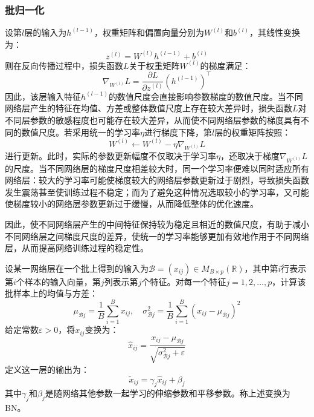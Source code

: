 \subsubsection{批归一化}
设第$l$层的输入为$h^{(l-1)}$，权重矩阵和偏置向量分别为$W^{(l)}$和$b^{(l)}$，其线性变换为：
\begin{equation*}
	z^{(l)}=W^{(l)}h^{(l-1)}+b^{(l)}
\end{equation*}
则在反向传播过程中，损失函数$L$关于权重矩阵$W^{(l)}$的梯度满足：
\begin{equation*}
	\nabla_{W^{(l)}}L=\frac{\partial L}{\partial z^{(l)}}\left(h^{(l-1)}\right)^{\top}
\end{equation*}
因此，该层输入特征$h^{(l-1)}$的数值尺度会直接影响参数梯度的数值尺度。当不同网络层产生的特征在均值、方差或整体数值尺度上存在较大差异时，损失函数$L$对不同层参数的敏感程度也可能存在较大差异，从而使不同网络层参数的梯度具有不同的数值尺度。若采用统一的学习率$\eta$进行梯度下降，第$l$层的权重矩阵按照：
\begin{equation*}
	W^{(l)}\leftarrow W^{(l)}-\eta\nabla_{W^{(l)}}L
\end{equation*}
进行更新。此时，实际的参数更新幅度不仅取决于学习率$\eta$，还取决于梯度$\nabla_{W^{(l)}}L$的尺度。当不同网络层的梯度尺度相差较大时，同一个学习率便难以同时适应所有网络层：较大的学习率可能使梯度较大的网络层参数更新过于剧烈，导致损失函数发生震荡甚至使训练过程不稳定；而为了避免这种情况选取较小的学习率，又可能使梯度较小的网络层参数更新过于缓慢，从而降低整体的优化速度。\par
因此，使不同网络层产生的中间特征保持较为稳定且相近的数值尺度，有助于减小不同网络层之间梯度尺度的差异，使统一的学习率能够更加有效地作用于不同网络层，从而提高网络训练过程的稳定性。
\begin{definition}
	设某一网络层在一个批上得到的输入为$\mathcal{B}=(x_{ij})\in M_{B\times p}(\mathbb{R})$，其中第$i$行表示第$i$个样本的输入向量，第$j$列表示第$j$个特征。对每一个特征$j=1,2,\dots,p$，计算该批样本上的均值与方差：
	\begin{equation*}
		\mu_{\mathcal{B}j}=\frac{1}{B}\sum_{i=1}^{B}x_{ij},\quad\sigma_{\mathcal{B}j}^2=\frac{1}{B}\sum_{i=1}^{B}(x_{ij}-\mu_{\mathcal{B}j})^2
	\end{equation*}
	给定常数$\varepsilon>0$，将$x_{ij}$变换为：
	\begin{equation*}
		\hat{x}_{ij}=\frac{x_{ij}-\mu_{\mathcal{B}j}}{\sqrt{\sigma_{\mathcal{B}j}^2+\varepsilon}}
	\end{equation*}
	定义这一层的输出为：
	\begin{equation*}
		\tilde{x}_{ij}=\gamma_j\hat{x}_{ij}+\beta_j
	\end{equation*}
	其中$\gamma_j$和$\beta_j$是随网络其他参数一起学习的伸缩参数和平移参数。称上述变换为\gls{BN}。
\end{definition}
